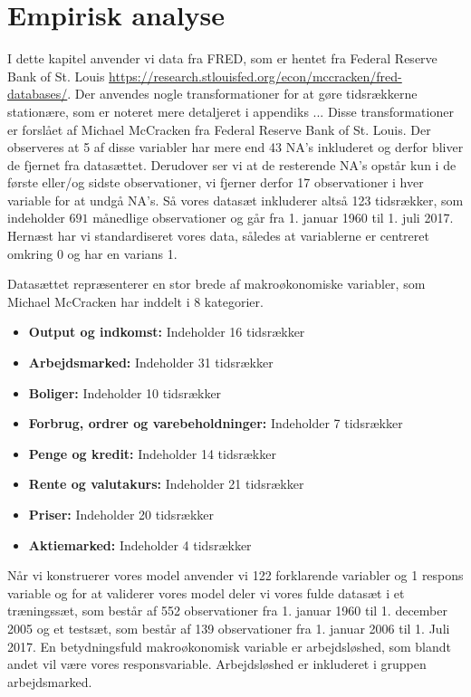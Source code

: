 \chapter{Empirisk analyse}
I dette kapitel anvender vi data fra FRED, som er hentet fra Federal Reserve Bank of St. Louis \url{https://research.stlouisfed.org/econ/mccracken/fred-databases/}.
Der anvendes nogle transformationer for at gøre tidsrækkerne stationære, som er noteret mere detaljeret i appendiks ... 
Disse transformationer er forslået af Michael McCracken fra Federal Reserve Bank of St. Louis.  
Der observeres at 5 af disse variabler har mere end 43 NA's inkluderet og derfor bliver de fjernet fra datasættet. 
Derudover ser vi at de resterende NA's opstår kun i de første eller/og sidste observationer, vi fjerner derfor 17 observationer i hver variable for at undgå NA's. 
Så vores datasæt inkluderer altså 123 tidsrækker, som indeholder $691$ månedlige observationer og går fra 1. januar 1960 til 1. juli 2017. 
Hernæst har vi standardiseret vores data, således at variablerne er centreret omkring 0 og har en varians 1. 

Datasættet repræsenterer en stor brede af makroøkonomiske variabler, som Michael McCracken har inddelt i 8 kategorier. 
\begin{itemize}
\item \textbf{Output og indkomst:} Indeholder 16 tidsrækker
\item \textbf{Arbejdsmarked:}  Indeholder 31 tidsrækker
\item \textbf{Boliger:} Indeholder 10 tidsrækker
\item \textbf{Forbrug, ordrer og varebeholdninger:} Indeholder 7 tidsrækker
\item \textbf{Penge og kredit:} Indeholder 14 tidsrækker
\item\textbf{ Rente og valutakurs:} Indeholder 21 tidsrækker
\item \textbf{Priser:} Indeholder 20 tidsrækker
\item \textbf{Aktiemarked:} Indeholder 4 tidsrækker
\end{itemize}

Når vi konstruerer vores model anvender vi 122 forklarende variabler og 1 respons variable og for at validerer vores model deler vi vores fulde datasæt i et træningssæt, som består af 552 observationer fra 1. januar 1960 til 1. december 2005 og et testsæt, som består af 139 observationer fra 1. januar 2006 til 1. Juli 2017. 
En betydningsfuld makroøkonomisk variable er arbejdsløshed, som blandt andet vil være vores responsvariable.  Arbejdsløshed er inkluderet i gruppen arbejdsmarked. 
